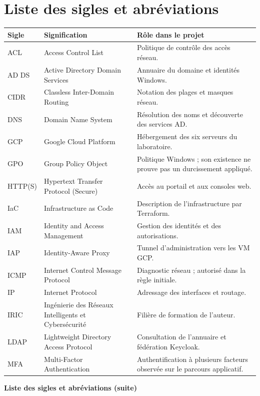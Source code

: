 \documentclass[a4paper,12pt]{report}
\begin{document}
\chapter*{Liste des sigles et abréviations}
\begingroup\small
\noindent\begin{tabularx}{\textwidth}{@{}p{2cm}p{5.6cm}Y@{}}
\toprule\textbf{Sigle} & \textbf{Signification} & \textbf{Rôle dans le projet}\\\midrule
ACL & Access Control List & Politique de contrôle des accès réseau.\\
AD DS & Active Directory Domain Services & Annuaire du domaine et identités Windows.\\
CIDR & Classless Inter-Domain Routing & Notation des plages et masques réseau.\\
DNS & Domain Name System & Résolution des noms et découverte des services AD.\\
GCP & Google Cloud Platform & Hébergement des six serveurs du laboratoire.\\
GPO & Group Policy Object & Politique Windows ; son existence ne prouve pas un durcissement appliqué.\\
HTTP(S) & Hypertext Transfer Protocol (Secure) & Accès au portail et aux consoles web.\\
IaC & Infrastructure as Code & Description de l'infrastructure par Terraform.\\
IAM & Identity and Access Management & Gestion des identités et des autorisations.\\
IAP & Identity-Aware Proxy & Tunnel d'administration vers les VM GCP.\\
ICMP & Internet Control Message Protocol & Diagnostic réseau ; autorisé dans la règle initiale.\\
IP & Internet Protocol & Adressage des interfaces et routage.\\
IRIC & Ingénierie des Réseaux Intelligents et Cybersécurité & Filière de formation de l'auteur.\\
LDAP & Lightweight Directory Access Protocol & Consultation de l'annuaire et fédération Keycloak.\\
MFA & Multi-Factor Authentication & Authentification à plusieurs facteurs observée sur le parcours applicatif.\\
\bottomrule\end{tabularx}
\clearpage
\noindent\textbf{Liste des sigles et abréviations (suite)}\par\medskip
\end{document}
